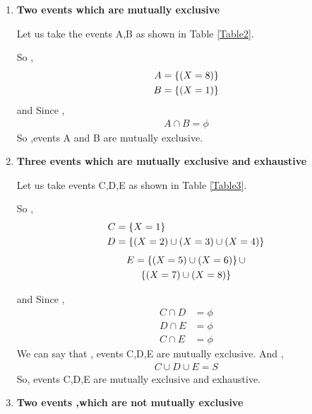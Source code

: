 \documentclass[journal,12pt,twocolumn]{IEEEtran}
\begin{document}
\begin{enumerate}[label=(\roman*)]
    \item 
    \textbf{Two events which are mutually exclusive} 
    
    Let us take the events A,B as shown in Table \ref{Table2}.
    \begin{table}[ht!]
        
        \caption{}
        \label{Table2}
    \end{table}
    So ,
    \begin{align}
        A &= \left\{ (X=8) \right\}\\
        B &= \left\{ (X=1) \right\}
    \end{align}
    and Since ,
    \begin{align}
        A \cap B = \phi
    \end{align}
    So ,events A and B are mutually exclusive.
  
    \item \textbf{Three events which are mutually exclusive and exhaustive}
    
    Let us take events C,D,E as shown in Table \ref{Table3}.
    \begin{table}[ht!]
        
        \caption{}
        \label{Table3}
    \end{table}
    So ,
    \begin{align}
        C &= \left\{ X=1\right\}  \\
        D &= \left\{ (X=2) \cup (X=3) \cup (X=4) \right\}
    \end{align}
    \begin{multline}
	    E =  \left\{(X=5) \cup (X=6)\right\} \cup \\
	         \left\{(X=7) \cup (X=8)\right\}
    \end{multline}
    
    and Since , 
    \begin{align}
        C \cap D &= \phi \\
        D \cap E &= \phi \\
        C \cap E &= \phi
    \end{align}
    We can say that , events C,D,E are mutually exclusive. And ,
    \begin{align}
        C \cup D \cup E = S 
    \end{align}  
    So, events C,D,E are mutually exclusive and exhaustive.
    
    \item \textbf{Two events ,which are not mutually exclusive}
    

\end{enumerate}
\end{document}
